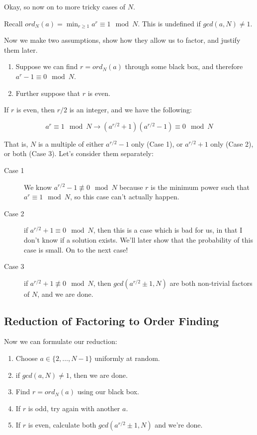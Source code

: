 \documentclass[12pt]{article}
\begin{document}
Okay, so now on to more tricky cases of $N$.

Recall $ord_N(a) = \min_{r \ge 1} a^r \equiv 1 \mod N$.
This is undefined if $gcd(a,N) \ne 1$.

Now we make two assumptions, show how they allow us to factor, and
justify them later.

\begin{enumerate}
\item
Suppose we can find $r = ord_N(a)$ through some black box,
and therefore $a^r - 1 \equiv 0 \mod N$.
\item
Further suppose that $r$ is even.
\end{enumerate}

If $r$ is even, then $r/2$ is an integer, and we have the following:

\begin{displaymath}
a^r \equiv 1 \mod N \rightarrow
(a^{r/2}+1)(a^{r/2}-1) \equiv 0 \mod N
\end{displaymath}

That is, $N$ is a multiple of either $a^{r/2}-1$ only (Case 1), or
$a^{r/2}+1$ only (Case 2),
or both (Case 3). Let's consider them separately:

\begin{description}
\item[Case 1] We know $a^{r/2}-1 \not\equiv 0 \mod N$ because $r$ is the minimum
power such that $a^r \equiv 1 \mod N$, so this case can't actually happen.
\item[Case 2] if $a^{r/2}+1 \equiv 0 \mod N$, then this is a case which is bad
for us, in that I don't know if a solution exists. We'll later show that
the probability of this case is small. On to the next case!
\item[Case 3] if $a^{r/2}+1 \not\equiv 0 \mod N$, then $gcd(a^{r/2} \pm 1, N)$ are both
non-trivial factors of $N$, and we are done.
\end{description}

\subsection{Reduction of Factoring to Order Finding}

Now we can formulate our reduction:

\begin{enumerate}
\item Choose $a \in \{2, \ldots, N-1\}$ uniformly at random.
\item if $gcd(a,N) \ne 1$, then we are done.
\item Find $r = ord_N(a)$ using our black box.
\item If $r$ is odd, try again with another $a$.
\item If $r$ is even, calculate both $gcd(a^{r/2} \pm 1, N)$ and we're done.
\end{enumerate}
\end{document}
